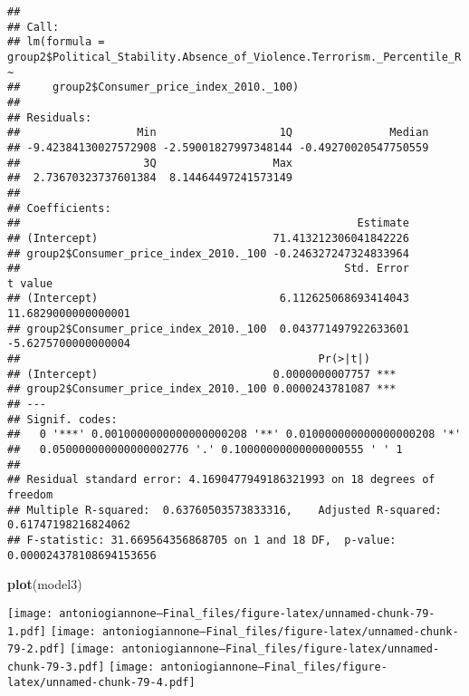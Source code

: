 \documentclass[
]{article}
\newenvironment{Shaded}{\begin{snugshade}}{\end{snugshade}}
\newcommand{\AttributeTok}[1]{\textcolor[rgb]{0.13,0.29,0.53}{#1}}
\newcommand{\FunctionTok}[1]{\textcolor[rgb]{0.13,0.29,0.53}{\textbf{#1}}}
\newcommand{\NormalTok}[1]{#1}
\newcommand{\SpecialCharTok}[1]{\textcolor[rgb]{0.81,0.36,0.00}{\textbf{#1}}}
\newcommand{\StringTok}[1]{\textcolor[rgb]{0.31,0.60,0.02}{#1}}
\begin{document}
\begin{verbatim}
## 
## Call:
## lm(formula = group2$Political_Stability.Absence_of_Violence.Terrorism._Percentile_R ~ 
##     group2$Consumer_price_index_2010._100)
## 
## Residuals:
##                  Min                   1Q               Median 
## -9.42384130027572908 -2.59001827997348144 -0.49270020547750559 
##                   3Q                  Max 
##  2.73670323737601384  8.14464497241573149 
## 
## Coefficients:
##                                                    Estimate
## (Intercept)                           71.413212306041842226
## group2$Consumer_price_index_2010._100 -0.246327247324833964
##                                                  Std. Error             t value
## (Intercept)                            6.112625068693414043 11.6829000000000001
## group2$Consumer_price_index_2010._100  0.043771497922633601 -5.6275700000000004
##                                              Pr(>|t|)    
## (Intercept)                           0.0000000007757 ***
## group2$Consumer_price_index_2010._100 0.0000243781087 ***
## ---
## Signif. codes:  
##   0 '***' 0.0010000000000000000208 '**' 0.010000000000000000208 '*'
##   0.050000000000000002776 '.' 0.10000000000000000555 ' ' 1
## 
## Residual standard error: 4.1690477949186321993 on 18 degrees of freedom
## Multiple R-squared:  0.63760503573833316,    Adjusted R-squared:  0.61747198216824062 
## F-statistic: 31.669564356868705 on 1 and 18 DF,  p-value: 0.000024378108694153656
\end{verbatim}

\begin{Shaded}
\begin{Highlighting}[]
\FunctionTok{plot}\NormalTok{(model3)}
\end{Highlighting}
\end{Shaded}

\texttt{[image: antoniogiannone---Final\_files/figure-latex/unnamed-chunk-79-1.pdf]}
\texttt{[image: antoniogiannone---Final\_files/figure-latex/unnamed-chunk-79-2.pdf]}
\texttt{[image: antoniogiannone---Final\_files/figure-latex/unnamed-chunk-79-3.pdf]}
\texttt{[image: antoniogiannone---Final\_files/figure-latex/unnamed-chunk-79-4.pdf]}

\begin{Shaded}
\end{Shaded}
\end{document}
